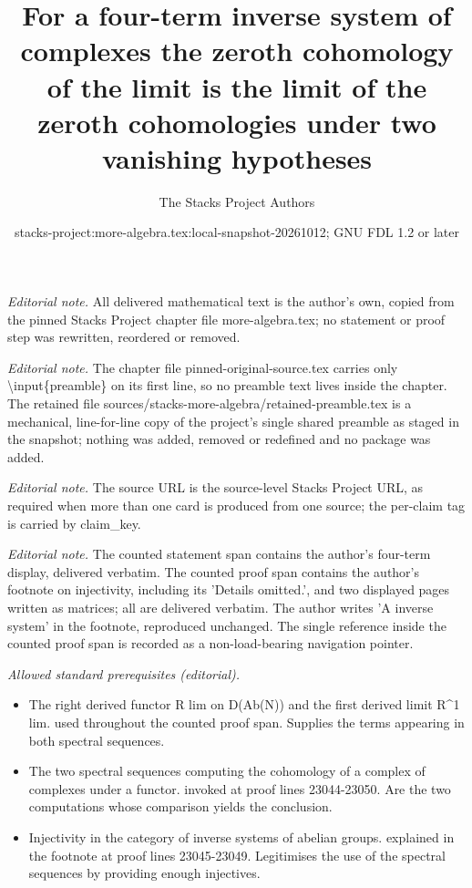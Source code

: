 \documentclass[10pt,a4paper]{amsart}
\title{For a four-term inverse system of complexes the zeroth cohomology of the limit is the limit of the zeroth cohomologies under two vanishing hypotheses}
\author{The Stacks Project Authors}
\date{stacks-project:more-algebra.tex:local-snapshot-20261012; GNU FDL 1.2 or later}
\theoremstyle{plain}
\theoremstyle{definition}
\theoremstyle{remark}
\numberwithin{equation}{subsection}
\begin{document}
\maketitle
\setcounter{subsection}{1}
\noindent\textit{Editorial note.} All delivered mathematical text is the author's own, copied from the pinned Stacks Project chapter file more-algebra.tex; no statement or proof step was rewritten, reordered or removed.\par\medskip
\noindent\textit{Editorial note.} The chapter file pinned-original-source.tex carries only \textbackslash{}input\{preamble\} on its first line, so no preamble text lives inside the chapter. The retained file sources/stacks-more-algebra/retained-preamble.tex is a mechanical, line-for-line copy of the project's single shared preamble as staged in the snapshot; nothing was added, removed or redefined and no package was added.\par\medskip
\noindent\textit{Editorial note.} The source URL is the source-level Stacks Project URL, as required when more than one card is produced from one source; the per-claim tag is carried by claim\_key.\par\medskip
\noindent\textit{Editorial note.} The counted statement span contains the author's four-term display, delivered verbatim. The counted proof span contains the author's footnote on injectivity, including its 'Details omitted.', and two displayed pages written as matrices; all are delivered verbatim. The author writes 'A inverse system' in the footnote, reproduced unchanged. The single reference inside the counted proof span is recorded as a non-load-bearing navigation pointer.\par\medskip
\noindent\textit{Allowed standard prerequisites (editorial).}\begin{itemize}
\item The right derived functor R lim on D(Ab(N)) and the first derived limit R\textasciicircum{}1 lim. used throughout the counted proof span. Supplies the terms appearing in both spectral sequences.
\item The two spectral sequences computing the cohomology of a complex of complexes under a functor. invoked at proof lines 23044-23050. Are the two computations whose comparison yields the conclusion.
\item Injectivity in the category of inverse systems of abelian groups. explained in the footnote at proof lines 23045-23049. Legitimises the use of the spectral sequences by providing enough injectives.
\end{itemize}\medskip
\end{document}
